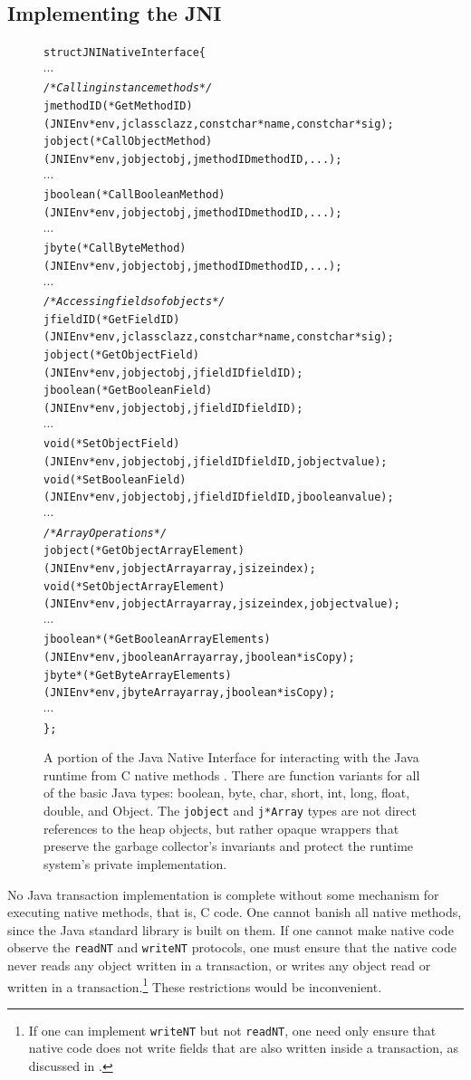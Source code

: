 \subsection{Implementing the JNI}
\begin{figure}\sis\fontsize{9}{10}\begin{alltt}
struct JNINativeInterface \{
  \(\cdots\)
  \textit{/* Calling instance methods */}
  jmethodID (*GetMethodID)
    (JNIEnv *env, jclass clazz, const char *name, const char *sig);
  jobject (*CallObjectMethod)
    (JNIEnv *env, jobject obj, jmethodID methodID, ...);
  \(\cdots\)
  jboolean (*CallBooleanMethod)
    (JNIEnv *env, jobject obj, jmethodID methodID, ...);
  \(\cdots\)
  jbyte (*CallByteMethod)
    (JNIEnv *env, jobject obj, jmethodID methodID, ...);
  \(\cdots\)
  \textit{/* Accessing fields of objects */}
  jfieldID (*GetFieldID)
    (JNIEnv *env, jclass clazz, const char *name, const char *sig);
  jobject (*GetObjectField)
    (JNIEnv *env, jobject obj, jfieldID fieldID);
  jboolean (*GetBooleanField)
    (JNIEnv *env, jobject obj, jfieldID fieldID);
  \(\cdots\)
  void (*SetObjectField)
    (JNIEnv *env, jobject obj, jfieldID fieldID, jobject value);
  void (*SetBooleanField)
    (JNIEnv *env, jobject obj, jfieldID fieldID, jboolean value);
  \(\cdots\)
  \textit{/* Array Operations */}
  jobject (*GetObjectArrayElement)
    (JNIEnv *env, jobjectArray array, jsize index);
  void (*SetObjectArrayElement)
    (JNIEnv *env, jobjectArray array, jsize index, jobject value);
  \(\cdots\)
  jboolean* (*GetBooleanArrayElements)
    (JNIEnv *env, jbooleanArray array, jboolean *isCopy);
  jbyte* (*GetByteArrayElements)
    (JNIEnv *env, jbyteArray array, jboolean *isCopy);
  \(\cdots\)
\};
\end{alltt}
\caption[A portion of the Java Native Interface] {A portion of the
  Java Native Interface for interacting with the Java runtime from C
  native methods \cite{JNI}\@.  There are function variants for all of the
  basic Java types: boolean, byte, char, short, int, long, float,
  double, and Object.  The \texttt{jobject} and
  \texttt{j*Array} types are not direct references to the heap
  objects, but rather opaque wrappers that preserve the garbage
  collector's invariants and protect the runtime system's private
  implementation.}
\label{fig:jni}
\end{figure}

No Java transaction implementation is complete without some mechanism
for executing native methods, that is, C code.  One cannot banish all
native methods, since the Java standard library is built on them. 
If one cannot make native code observe the \texttt{readNT} and
\texttt{writeNT} protocols, one must ensure that the native code never
reads any object written in a transaction, or writes any object read
or written in a transaction.\footnote{If one
  can implement \texttt{writeNT} but not \texttt{readNT}, one need
  only ensure that native code does not write fields that are also
  written inside a transaction, as discussed in .}
These restrictions would be inconvenient.

